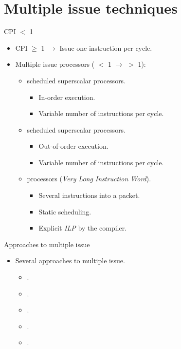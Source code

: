 \section{Multiple issue techniques}

\begin{frame}[t]{CPI $<$ 1}
\begin{itemize}
  \item CPI $\geq$ 1 $\rightarrow$ Issue one instruction per cycle.

  \item Multiple issue processors
        ( $<$ 1 $\rightarrow$  $>$ 1):
    \begin{itemize}

      \item {} scheduled superscalar processors.
        \begin{itemize}
          \item In-order execution.
          \item Variable number of instructions per cycle.
        \end{itemize}
      \item {} scheduled superscalar processors.
        \begin{itemize}
          \item Out-of-order execution.
          \item Variable number of instructions per cycle.
        \end{itemize}
      \item {} processors (\emph{Very Long Instruction Word}).
        \begin{itemize}
          \item Several instructions into a packet.
          \item Static scheduling.
          \item Explicit \emph{ILP} by the compiler.
        \end{itemize}
    \end{itemize}
\end{itemize}
\end{frame}

\begin{frame}[t]{Approaches to multiple issue}
\begin{itemize}
  \item Several approaches to multiple issue.
    \begin{itemize}
      \item {}.
      \item {}.
      \item {}.
      \item {}.
      \item {}.
    \end{itemize}
\end{itemize}
\end{frame}


